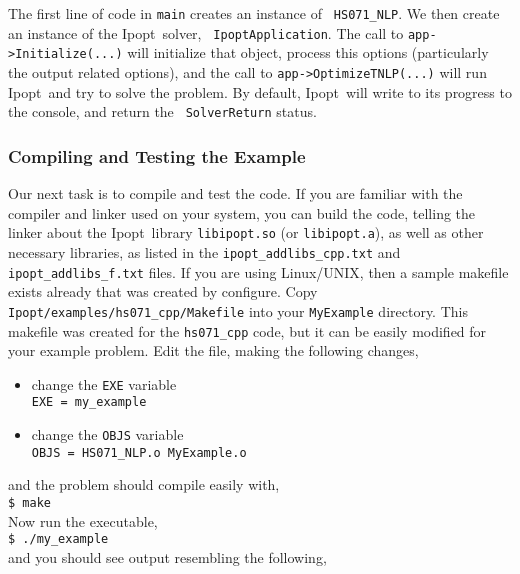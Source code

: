 \documentclass[10pt]{article}
\newcommand{\Ipopt}{{\sc Ipopt}}
\begin{document}
The first line of code in {\tt main} creates an instance of {\tt
  HS071\_NLP}. We then create an instance of the \Ipopt\ solver, {\tt
  IpoptApplication}. The call to {\tt app->Initialize(...)} will
initialize that object, process this options (particularly the output
related options), and the call to {\tt app->OptimizeTNLP(...)}  will
run \Ipopt\ and try to solve the problem. By default, \Ipopt\ will
write to its progress to the console, and return the {\tt
  SolverReturn} status.

\subsubsection{Compiling and Testing the Example}
Our next task is to compile and test the code. If you are familiar
with the compiler and linker used on your system, you can build the
code, telling the linker about the \Ipopt\ library {\tt libipopt.so}
(or {\tt libipopt.a}), as well as other necessary libraries, as listed
in the {\tt ipopt\_addlibs\_cpp.txt} and {\tt ipopt\_addlibs\_f.txt}
files.  If you are using Linux/UNIX, then a sample makefile exists
already that was created by configure.  Copy {\tt
  Ipopt/examples/hs071\_cpp/Makefile} into your {\tt MyExample}
directory.  This makefile was created for the {\tt hs071\_cpp} code,
but it can be easily modified for your example problem. Edit the file,
making the following changes,

\begin{itemize}
\item change the {\tt EXE} variable \\
{\tt EXE = my\_example}
\item change the {\tt OBJS} variable \\
{\tt OBJS = HS071\_NLP.o MyExample.o}
\end{itemize}
and the problem should compile easily with, \\
{\tt \$ make} \\
Now run the executable,\\ 
{\tt \$ ./my\_example} \\
and you should see output resembling the following,
\end{document}
